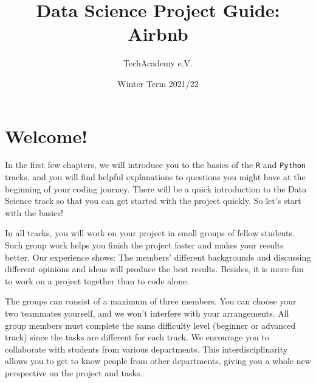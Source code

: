 \documentclass[
  11pt,
]{article}
\title{Data Science Project Guide: Airbnb}
\author{TechAcademy e.V.}
\date{Winter Term 2021/22}
\begin{document}
\maketitle

\clearpage

\addtolength{\headheight}{17.82275pt}

\fancyfoot{}
\fancyfoot[R]{\thepage}
\addtolength{\headheight}{17.82275pt}


\renewcommand{\headrulewidth}{0.25pt}
\renewcommand{\footrulewidth}{0.25pt}

\tableofcontents
\clearpage

\hypertarget{welcome}{%
\section{Welcome!}\label{welcome}}

In the first few chapters, we will introduce you to the basics of the \texttt{R} and \texttt{Python} tracks, and you will find helpful explanations to questions you might have at the beginning of your coding journey.
There will be a quick introduction to the Data Science track so that you can get started with the project quickly.
So let's start with the basics!

In all tracks, you will work on your project in small groups of fellow students.
Such group work helps you finish the project faster and makes your results better.
Our experience shows: The members' different backgrounds and discussing different opinions and ideas will produce the best results.
Besides, it is more fun to work on a project together than to code alone.

The groups can consist of a maximum of three members.
You can choose your two teammates yourself, and we won't interfere with your arrangements.
All group members must complete the same difficulty level (beginner or advanced track) since the tasks are different for each track.
We encourage you to collaborate with students from various departments.
This interdisciplinarity allows you to get to know people from other departments, giving you a whole new perspective on the project and tasks.\\
\end{document}

